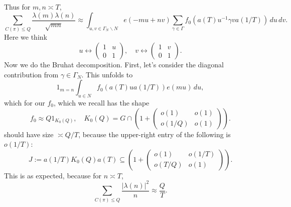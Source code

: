 \documentclass[reqno]{amsart} 
\begin{document}
Thus for $m, n \asymp T$,
\begin{equation*}
  \sum _{C(\pi) \leq Q} \frac{\lambda(m) \lambda(n)}{\sqrt{m n}}
  \approx \int _{u , v \in \Gamma_N \backslash N} e(-m u + n v) \sum _{\gamma \in \Gamma } f _0 (a(T) u ^{-1} \gamma v a(1/T)) \, d u \, d v.
\end{equation*}
Here we think
\begin{equation*}
  u \leftrightarrow
  \begin{pmatrix}
    1 & u \\
    0 & 1
  \end{pmatrix},
  \quad
  v \leftrightarrow
  \begin{pmatrix}
    1 & v \\
    0 & 1
  \end{pmatrix}.
\end{equation*}
Now we do the Bruhat decomposition.  First, let's consider the diagonal contribution from $\gamma \in \Gamma _N$.  This unfolds to
\begin{equation*}
  1 _{m = n} \int _{u \in N} f _0 (a(T) u a(1/T)) e(m u) \, d u,
\end{equation*}
which for our $f_0$, which we recall has the shape
\begin{equation*}
  f_0 \approx Q 1 _{K_0(Q)}, \quad K_0(Q) = G \cap \left( 1 +
    \begin{pmatrix}
      o(1) & o(1) \\
      o(1/Q) & o(1)
    \end{pmatrix} \right).
\end{equation*}
should have size $\asymp Q/T$, because the upper-right entry of the following is $o(1/T)$:
\begin{equation*}
  J := a(1/T) K_0(Q) a(T) \subseteq \left( 1 +
    \begin{pmatrix}
      o(1) & o(1/T) \\
      o(T/Q) & o(1)
    \end{pmatrix} \right).
\end{equation*}
This is as expected, because for $n \asymp T$,
\begin{equation*}
  \sum _{C(\pi) \leq Q} \frac{|\lambda(n)|^2}{n} \approx \frac{Q}{T}.
\end{equation*}
\end{document}
